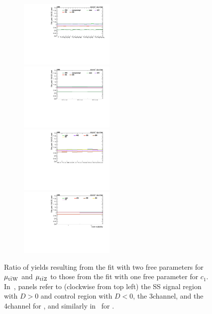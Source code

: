\begin{figure}
\begin{subfigure}{\linewidth}
    \includegraphics[width=0.5\textwidth]{figures/thirteen-TeV/postfit/ratio_2l_cHu}%
    \includegraphics[width=0.5\textwidth]{figures/thirteen-TeV/postfit/ratio_2l-cr_cHu}
    \includegraphics[width=0.5\textwidth]{figures/thirteen-TeV/postfit/ratio_3l_cHu}%
    \includegraphics[width=0.5\textwidth]{figures/thirteen-TeV/postfit/ratio_4l_cHu}
    \caption{}
    \label{sfig:ratio-cHu}
  \end{subfigure}
  \caption[Ratio of two and one-dimensional fit yields for \cH and \cHu (\thirteenTeV)]{Ratio of yields resulting from the fit with two free parameters for $\mu_{\text{t}\bar{\text{t}}\text{W}}$ and $\mu_{\text{t}\bar{\text{t}}\text{Z}}$ to those from the fit with one free parameter for $c_1$. In~, panels refer to (clockwise from top left) the SS \ttW signal region with $D > 0$ and control region with $D < 0$, the 3\lep \ttZ channel, and the 4\lep \ttZ channel for \cH, and similarly in~ for \cHu.}
  \label{fig:ratio-cH-cHu}
\end{figure}

